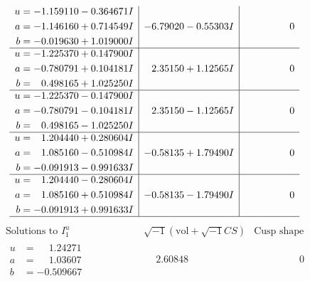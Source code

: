 \documentclass[1p]{elsarticle_modified}
\theoremstyle{definition}
\newcommand{\I}{\sqrt{-1}}
\begin{document}
$$\begin{array}{c|c|c}
\begin{aligned}
u &= -1.159110 - 0.364671 I \\
a &= -1.146160 + 0.714549 I \\
b &= -0.019630 + 1.019000 I\end{aligned}
 & -6.79020 - 0.55303 I & \phantom{-0.000000 } 0 \\ \hline\begin{aligned}
u &= -1.225370 + 0.147900 I \\
a &= -0.780791 + 0.104181 I \\
b &= \phantom{-}0.498165 + 1.025250 I\end{aligned}
 & \phantom{-}2.35150 + 1.12565 I & \phantom{-0.000000 } 0 \\ \hline\begin{aligned}
u &= -1.225370 - 0.147900 I \\
a &= -0.780791 - 0.104181 I \\
b &= \phantom{-}0.498165 - 1.025250 I\end{aligned}
 & \phantom{-}2.35150 - 1.12565 I & \phantom{-0.000000 } 0 \\ \hline\begin{aligned}
u &= \phantom{-}1.204440 + 0.280604 I \\
a &= \phantom{-}1.085160 - 0.510984 I \\
b &= -0.091913 - 0.991633 I\end{aligned}
 & -0.58135 + 1.79490 I & \phantom{-0.000000 } 0 \\ \hline\begin{aligned}
u &= \phantom{-}1.204440 - 0.280604 I \\
a &= \phantom{-}1.085160 + 0.510984 I \\
b &= -0.091913 + 0.991633 I\end{aligned}
 & -0.58135 - 1.79490 I & \phantom{-0.000000 } 0\\
 \hline 
 \end{array}$$\newpage$$\begin{array}{c|c|c}  
\text{Solutions to }I^u_{1}& \I (\text{vol} + \sqrt{-1}CS) & \text{Cusp shape}\\
 \hline 
\begin{aligned}
u &= \phantom{-}1.24271\phantom{ +0.000000I} \\
a &= \phantom{-}1.03607\phantom{ +0.000000I} \\
b &= -0.509667\phantom{ +0.000000I}\end{aligned}
 & \phantom{-}2.60848\phantom{ +0.000000I} & \phantom{-0.000000 } 0 \\ \hline\begin{aligned}

\end{aligned}
\end{array}$$
\end{document}
